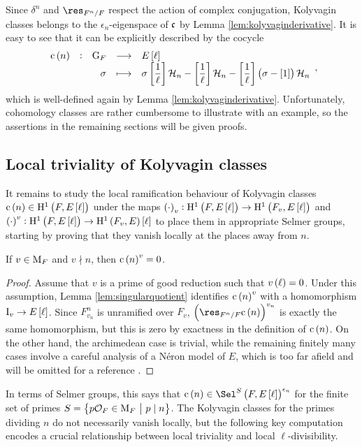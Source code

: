 Since $ \delta^n $ and $ \res_{F^n / F} $ respect the action of complex conjugation, Kolyvagin classes belongs to the $ \epsilon_n $-eigenspace of $ \mathfrak{c} $ by Lemma \ref{lem:kolyvaginderivative}. It is easy to see that it can be explicitly described by the cocycle
$$ \function[\c\br{n}]{\G_F}{E\sbr{\ell}}{\sigma}{\sigma\sbr{\dfrac{1}{\ell}} \HHH_n - \sbr{\dfrac{1}{\ell}} \HHH_n - \sbr{\dfrac{1}{\ell}}\br{\sigma - \sbr{1}} \HHH_n}, $$
which is well-defined again by Lemma \ref{lem:kolyvaginderivative}. Unfortunately, cohomology classes are rather cumbersome to illustrate with an example, so the assertions in the remaining sections will be given proofs.

\pagebreak

\subsection{Local triviality of Kolyvagin classes}

It remains to study the local ramification behaviour of Kolyvagin classes $ \c\br{n} \in \H^1\br{F, E\sbr{\ell}} $ under the maps $ \br{\cdot}_v : \H^1\br{F, E\sbr{\ell}} \to \H^1\br{F_v, E\sbr{\ell}} $ and $ \br{\cdot}^v : \H^1\br{F, E\sbr{\ell}} \to \H^1\br{F_v, E}\sbr{\ell} $ to place them in appropriate Selmer groups, starting by proving that they vanish locally at the places away from $ n $.

\begin{lemma}
\label{lem:localzero}
If $ v \in \mathrm{M}_F $ and $ v \nmid n $, then $ \c\br{n}^v = 0 $.
\end{lemma}

\begin{proof}
Assume that $ v $ is a prime of good reduction such that $ v\br{\ell} = 0 $. Under this assumption, Lemma \ref{lem:singularquotient} identifies $ \c\br{n}^v $ with a homomorphism $ \I_v \to E\sbr{\ell} $. Since $ F_{v_n}^n $ is unramified over $ F_v $, $ \br{\res_{F^n / F} \c\br{n}}^{v_n} $ is exactly the same homomorphism, but this is zero by exactness in the definition of $ \c\br{n} $. On the other hand, the archimedean case is trivial, while the remaining finitely many cases involve a careful analysis of a N\'eron model of $ E $, which is too far afield and will be omitted for a reference \cite[Proposition 6.2]{Gro91}.
\end{proof}

In terms of Selmer groups, this says that $ \c\br{n} \in \Sel^S\br{F, E\sbr{\ell}}^{\epsilon_n} $ for the finite set of primes $ S = \cbr{p\OOO_F \in \M_F \st p \mid n} $. The Kolyvagin classes for the primes dividing $ n $ do not necessarily vanish locally, but the following key computation encodes a crucial relationship between local triviality and local $ \ell $-divisibility.

